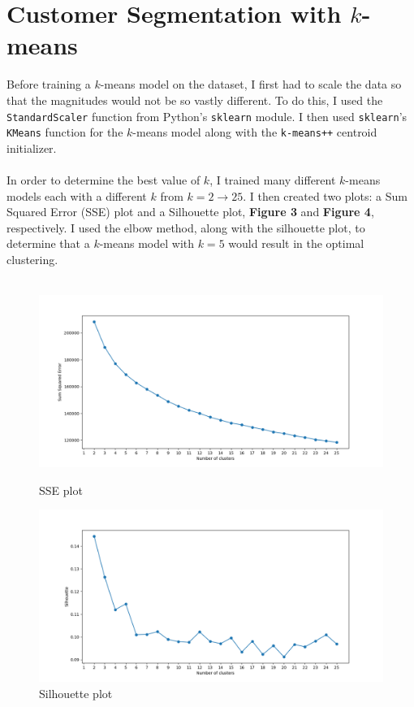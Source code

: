 \documentclass[12pt, notitlepage]{article}
\begin{document}
\section{Customer Segmentation with $k$-means}
Before training a $k$-means model on the dataset, I first had to scale the data so that the magnitudes would not be so vastly different. To do this, I used the \texttt{StandardScaler} function from Python's \texttt{sklearn} module. I then used \texttt{sklearn}'s \texttt{KMeans} function for the $k$-means model along with the \texttt{k-means++} centroid initializer. \\\\
In order to determine the best value of $k$, I trained many different $k$-means models each with a different $k$ from $k=2 \rightarrow 25$. I then created two plots: a Sum Squared Error (SSE) plot and a Silhouette plot, \textbf{Figure 3} and \textbf{Figure 4}, respectively. I used the elbow method, along with the silhouette plot, to determine that a $k$-means model with $k=5$ would result in the optimal clustering.\\\\

\begin{figure}[H]
	\centering
	\includegraphics[scale=0.6]{kmeans_SSE.png}
	\caption{SSE plot}
	\includegraphics[scale=0.6]{kmeans_silhouette.png}
	\caption{Silhouette plot}
\end{figure}
\end{document}
